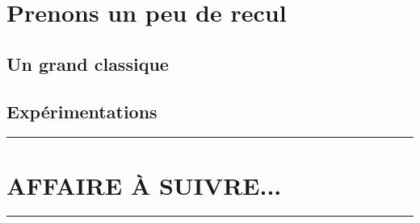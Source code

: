 \documentclass[12pt]{amsart}
\begin{document}






\section{Prenons un peu de recul} \label{general-case}

\subsection{Un grand classique}




\subsection{Expérimentations}




\bigskip

\hrule

\section{AFFAIRE À SUIVRE...}

\bigskip

\hrule


%
%
\end{document}
